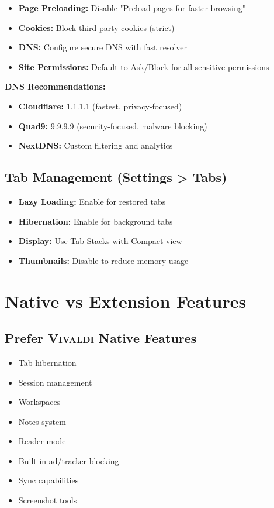 \documentclass[11pt,a4paper,oneside]{book}
\newcommand{\vivaldi}{\textsc{Vivaldi}}
\newcommand{\menupath}[1]{\textbf{\color{darkgray}#1}}
\begin{document}
\begin{itemize}
    \item \textbf{Page Preloading:} Disable "Preload pages for faster browsing"
    \item \textbf{Cookies:} Block third-party cookies (strict)
    \item \textbf{DNS:} Configure secure DNS with fast resolver
    \item \textbf{Site Permissions:} Default to Ask/Block for all sensitive permissions
\end{itemize}

\begin{tipbox}
\textbf{DNS Recommendations:}
\begin{itemize}
    \item \textbf{Cloudflare:} 1.1.1.1 (fastest, privacy-focused)
    \item \textbf{Quad9:} 9.9.9.9 (security-focused, malware blocking)
    \item \textbf{NextDNS:} Custom filtering and analytics
\end{itemize}
\end{tipbox}

\subsection{Tab Management (\menupath{Settings > Tabs})}

\begin{itemize}
    \item \textbf{Lazy Loading:} Enable for restored tabs
    \item \textbf{Hibernation:} Enable for background tabs
    \item \textbf{Display:} Use Tab Stacks with Compact view
    \item \textbf{Thumbnails:} Disable to reduce memory usage
\end{itemize}

\section{Native vs Extension Features}

\subsection{Prefer \vivaldi{} Native Features}

\begin{multicols}{2}
\begin{itemize}
    \item Tab hibernation
    \item Session management
    \item Workspaces
    \item Notes system
    \item Reader mode
    \item Built-in ad/tracker blocking
    \item Sync capabilities
    \item Screenshot tools
\end{itemize}
\end{multicols}
\end{document}
